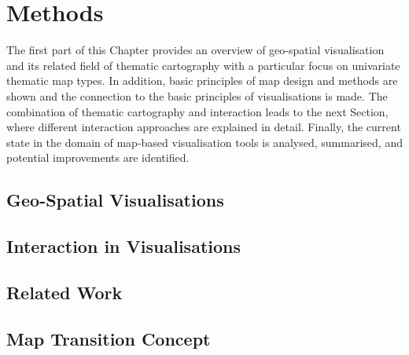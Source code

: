 \section{Methods}
\label{s:methods}
The first part of this Chapter provides an overview of geo-spatial visualisation and its related field of thematic cartography with a particular focus on univariate thematic map types. In addition, basic principles of map design and methods are shown and the connection to the basic principles of visualisations is made.
The combination of thematic cartography and interaction leads to the next Section, where different interaction approaches are explained in detail. Finally, the current state in the domain of map-based visualisation tools is analysed, summarised, and potential improvements are identified.

\subsection{Geo-Spatial Visualisations}
\label{s:cartography}


% 

\subsection{Interaction in Visualisations}
\label{s:interaction}


\newpage
\subsection{Related Work}


\subsection{Map Transition Concept}
\label{s:theoretical-contrib}
